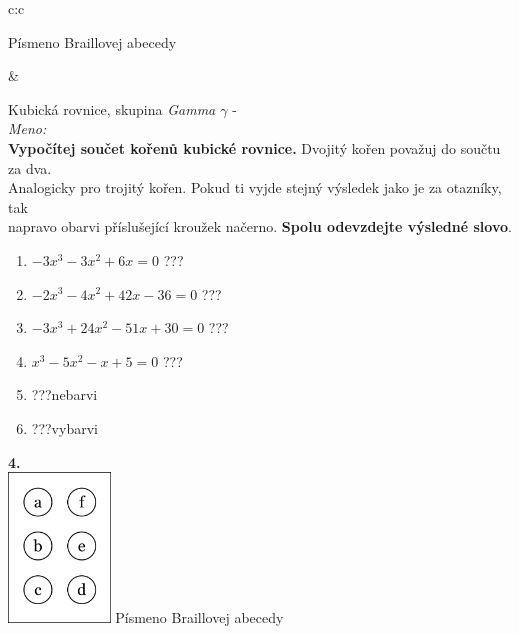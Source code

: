 \documentclass[10pt]{report}
\begin{document}
\begin{tabular}{c:c}
\begin{minipage}[c][99mm][t]{0.49\linewidth}
\begin{center}
\begin{minipage}{0.20\linewidth}
\begin{center}
{\small Písmeno Braillovej abecedy}
\end{center}
\end{minipage}
\end{center}
\end{minipage}
&
\begin{minipage}[c][99mm][t]{0.49\linewidth}
\begin{center}
\vspace{7mm}
{\huge Kubická rovnice, skupina \textit{Gamma $\gamma$} -}\\[4.5mm]
\textit{Meno:}\phantom{xxxxxxxxxxxxxxxxxxxxxxxxxxxxxxxxxxxxxxxxxxxxxxxxxxxxxxxxxxxxxxxxx}\\[3.5mm]
\textbf{Vypočítej součet kořenů kubické rovnice.} Dvojitý kořen považuj do součtu za dva.\\Analogicky pro trojitý kořen. Pokud ti vyjde stejný výsledek jako je za otazníky, tak\\napravo obarvi příslušející kroužek načerno. \textbf{Spolu odevzdejte výsledné slovo}.\\[3mm]
\begin{minipage}{0.77\linewidth}
\begin{center}
\begin{varwidth}{\textwidth}
\begin{enumerate}
\large
\item $-3x^3-3x^2+6x=0$\quad \dotfill\; ???\;\dotfill {}
\item $-2x^3-4x^2+42x-36=0$\quad \dotfill\; ???\;\dotfill {}
\item $-3x^3+24x^2-51x+30=0$\quad \dotfill\; ???\;\dotfill {}
\item $x^3-5x^2-x+5=0$\quad \dotfill\; ???\;\dotfill {}
\item \quad \dotfill\; ???\;\dotfill \quad nebarvi
\item \quad \dotfill\; ???\;\dotfill \quad vybarvi
\end{enumerate}
\end{varwidth}
\end{center}
\end{minipage}
\begin{minipage}{0.20\linewidth}
\begin{center}
{\Huge\bfseries 4.} \\[2mm]
\includegraphics[height=40mm]{../images/braille.png}
{\small Písmeno Braillovej abecedy}
\end{center}
\end{minipage}
\end{center}
\end{minipage}

\end{tabular}
\end{document}
